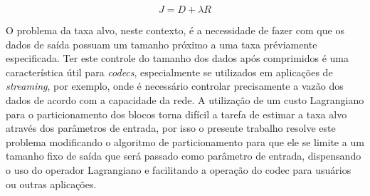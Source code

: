     \begin{equation}
        \label{eqn:lagrangian_cost}
        J = D + \lambda R
    \end{equation}

    O problema da taxa alvo, neste contexto, é a necessidade de fazer com que os dados de saída possuam um tamanho próximo a uma taxa préviamente
    especificada. Ter este controle do tamanho dos dados após comprimidos é uma característica útil para \textit{codecs}, especialmente se utilizados em
    aplicações de \textit{streaming}, por exemplo, onde é necessário controlar precisamente a vazão dos dados de acordo com a capacidade da rede. A utilização
    de um custo Lagrangiano para o particionamento dos blocos torna difícil a tarefa de estimar a taxa alvo através dos parâmetros de entrada, por isso
    o presente trabalho resolve este problema modificando o algoritmo de particionamento para que ele se limite a um tamanho fixo de saída que será 
    passado como parâmetro de entrada, dispensando o uso do operador Lagrangiano e facilitando a operação do codec para usuários ou outras aplicações.








